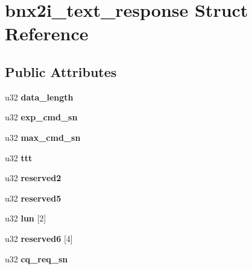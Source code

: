 \hypertarget{structbnx2i__text__response}{
\section{bnx2i\_\-text\_\-response Struct Reference}
\label{structbnx2i__text__response}
}
\subsection*{Public Attributes}
\begin{DoxyCompactItemize}
\item 
\hypertarget{structbnx2i__text__response_a077e89a20a04c93c7f58a267456be734}{
u32 {\bfseries data\_\-length}}
\label{structbnx2i__text__response_a077e89a20a04c93c7f58a267456be734}

\item 
\hypertarget{structbnx2i__text__response_a9141e140cc0013b71eeab7ba2f11e36f}{
u32 {\bfseries exp\_\-cmd\_\-sn}}
\label{structbnx2i__text__response_a9141e140cc0013b71eeab7ba2f11e36f}

\item 
\hypertarget{structbnx2i__text__response_a50c4b1a001238b66ad264b62c5a2b4c8}{
u32 {\bfseries max\_\-cmd\_\-sn}}
\label{structbnx2i__text__response_a50c4b1a001238b66ad264b62c5a2b4c8}

\item 
\hypertarget{structbnx2i__text__response_a075770d5e97e64e4a5898cfa0f85018e}{
u32 {\bfseries ttt}}
\label{structbnx2i__text__response_a075770d5e97e64e4a5898cfa0f85018e}

\item 
\hypertarget{structbnx2i__text__response_a56c5e3ae34bea9b784417705fef99ac8}{
u32 {\bfseries reserved2}}
\label{structbnx2i__text__response_a56c5e3ae34bea9b784417705fef99ac8}

\item 
\hypertarget{structbnx2i__text__response_abeed7007f18745cc3dd66c55a7f88266}{
u32 {\bfseries reserved5}}
\label{structbnx2i__text__response_abeed7007f18745cc3dd66c55a7f88266}

\item 
\hypertarget{structbnx2i__text__response_a1dc5bd3975a9b773c9be06f4f3a8757d}{
u32 {\bfseries lun} \mbox{[}2\mbox{]}}
\label{structbnx2i__text__response_a1dc5bd3975a9b773c9be06f4f3a8757d}

\item 
\hypertarget{structbnx2i__text__response_a1660169ca20bfbcb6ef368a5c3f89b1a}{
u32 {\bfseries reserved6} \mbox{[}4\mbox{]}}
\label{structbnx2i__text__response_a1660169ca20bfbcb6ef368a5c3f89b1a}

\item 
\hypertarget{structbnx2i__text__response_a38f540b947e988e15a37087317816fcf}{
u32 {\bfseries cq\_\-req\_\-sn}}
\label{structbnx2i__text__response_a38f540b947e988e15a37087317816fcf}

\end{DoxyCompactItemize}


